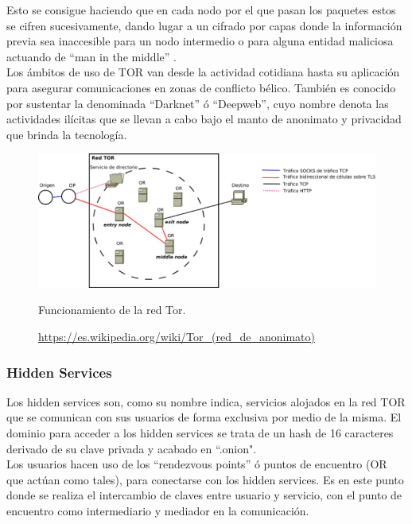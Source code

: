 Esto se consigue haciendo que en cada nodo por el que pasan los paquetes estos se cifren sucesivamente, dando lugar a un cifrado por capas donde la información previa sea inaccesible para un nodo intermedio o para alguna entidad maliciosa actuando de \hyphenquote{spanish}{man in the middle}
\cite{WikiManInTheMiddle}. \\

Los ámbitos de uso de TOR van desde la actividad cotidiana hasta su aplicación para asegurar comunicaciones en zonas de conflicto bélico. También es conocido por sustentar la denominada \hyphenquote{spanish}{Darknet} ó \hyphenquote{spanish}{Deepweb}, cuyo nombre denota las actividades ilícitas que se llevan a cabo bajo el manto de anonimato y privacidad que brinda la tecnología. \\

\begin{figure}[H]
	\centering
	\includegraphics[width=\textwidth]{imagenes/funcionamiento_tor}
	\caption{Funcionamiento de la red Tor.}
	\caption*{\small \url {https://es.wikipedia.org/wiki/Tor_(red_de_anonimato)}}
	\label{fig:redtor}
\end{figure}

\subsubsection {Hidden Services}

Los hidden services son, como su nombre indica, servicios alojados en la red TOR que se comunican con sus usuarios de forma exclusiva por medio de la misma. El dominio para acceder a los hidden services se trata de un hash de 16 caracteres derivado de su clave privada y acabado en ``.onion". \\

Los usuarios hacen uso de los \hyphenquote{spanish}{rendezvous points} ó puntos de encuentro (OR que actúan como tales), para conectarse con los hidden services. Es en este punto donde se realiza el intercambio de claves entre usuario y servicio, con el punto de encuentro como intermediario y mediador en la comunicación. \\ 


